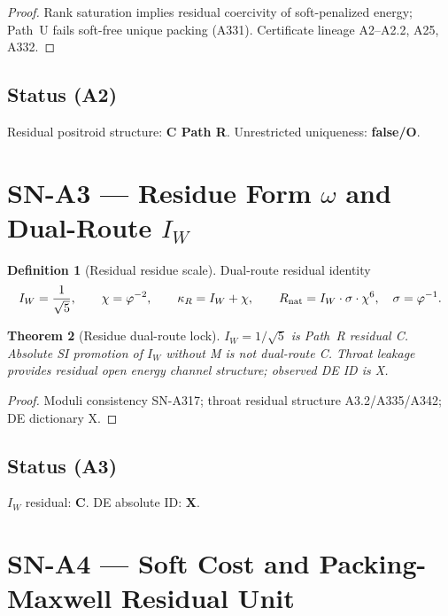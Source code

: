 \documentclass[11pt,a4paper]{article}
\newtheorem{theorem}{Theorem}[section]
\theoremstyle{definition}
\newtheorem{definition}[theorem]{Definition}
\begin{document}
\begin{proof}
Rank saturation implies residual coercivity of soft-penalized energy; Path~U fails soft-free
unique packing (A331). Certificate lineage A2--A2.2, A25, A332.
\end{proof}

\subsection*{Status (A2)} Residual positroid structure: \textbf{C Path R}. Unrestricted uniqueness: \textbf{false/O}.

\section{SN-A3 --- Residue Form $\omega$ and Dual-Route $I_W$}
\label{sec:SNA3}

\begin{definition}[Residual residue scale]
\label{def:A3-IW}
Dual-route residual identity
\begin{equation}
I_W=\frac{1}{\sqrt{5}},\qquad
\chi=\varphi^{-2},\qquad
\kappa_R=I_W+\chi,\qquad
R_{\rm nat}=I_W\cdot\sigma\cdot\chi^{6},\quad \sigma=\varphi^{-1}.
\end{equation}
\end{definition}

\begin{theorem}[Residue dual-route lock]
\label{thm:A3}
$I_W=1/\sqrt{5}$ is Path~R residual C. Absolute SI promotion of $I_W$ without M is not dual-route C.
Throat leakage provides residual open energy channel structure; observed DE ID is X.
\end{theorem}

\begin{proof}
Moduli consistency SN-A317; throat residual structure A3.2/A335/A342; DE dictionary X.
\end{proof}

\subsection*{Status (A3)} $I_W$ residual: \textbf{C}. DE absolute ID: \textbf{X}.

\section{SN-A4 --- Soft Cost and Packing-Maxwell Residual Unit}
\label{sec:SNA4}
\end{document}
